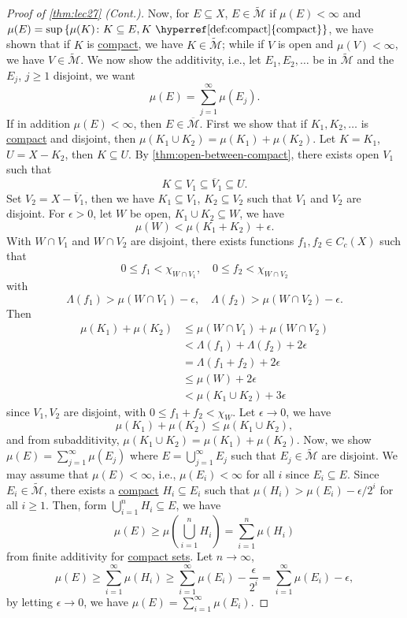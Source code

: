 \begin{proof}[Proof of \autoref{thm:lec27} (Cont.)]
	Now, for \(E \subseteq X\), \(E \in \widetilde{\mathcal{M}} \) if \(\mu (E) < \infty \) and \(\mu (E) = \sup \left\{ \mu (K) \colon K \subseteq E, K \text{ \hyperref[def:compact]{compact}}  \right\} \), we have shown that if \(K\) is \hyperref[def:compact]{compact}, we have \(K \in \widetilde{\mathcal{M}} \); while if \(V\) is open and \(\mu (V) < \infty \), we have \(V\in \widetilde{\mathcal{M}} \). We now show the additivity, i.e., let \(E_1, E_2, \dots \) be in \( \widetilde{\mathcal{M}} \) and the \(E_j\), \(j\geq 1\) disjoint, we want
	\[
		\mu (E) = \sum_{j=1}^{\infty} \mu (E_j).
	\]
	If in addition \(\mu (E) < \infty \), then \(E \in \overline{\mathcal{M}}\). First we show that if \(K_1, K_2, \dots  \) is \hyperref[def:compact]{compact} and disjoint, then \(\mu (K_1 \cup K_2) = \mu (K_1) + \mu (K_2)\). Let \(K = K_1\), \(U = X - K_2\), then \(K \subseteq U\). By \autoref{thm:open-between-compact}, there exists open \(V_1\) such that
	\[
		K \subseteq V_1 \subseteq \overline{V} _1 \subseteq U.
	\]
	Set \(V_2 = X - \overline{V} _1\), then we have \(K_1 \subseteq V_1\), \(K_2 \subseteq V_2\) such that \(V_1\) and \(V_2\) are disjoint. For \(\epsilon > 0\), let \(W\) be open, \(K_1 \cup K_2 \subseteq W\), we have
	\[
		\mu (W) < \mu (K_1 + K_2) + \epsilon.
	\]
	With \(W \cap V_1\) and \(W \cap V_2\) are disjoint, there exists functions \(f_1, f_2 \in C_c(X)\) such that
	\[
		0 \leq f_1 < \chi _{W \cap V_1}, \quad 0 \leq f_2 < \chi _{W \cap V_2}
	\]
	with
	\[
		\Lambda (f_1) > \mu (W \cap V_1) - \epsilon ,\quad \Lambda (f_2) > \mu (W \cap V_2) - \epsilon.
	\]
	Then
	\[
		\begin{split}
			\mu (K_1) + \mu (K_2)
			&\leq \mu (W \cap V_1) + \mu (W \cap V_2) \\
			&< \Lambda (f_1) + \Lambda (f_2) + 2\epsilon \\
			&= \Lambda (f_1 + f_2) + 2\epsilon \\
			&\leq \mu (W) + 2\epsilon \\
			&< \mu (K_1 \cup K_2) + 3\epsilon
		\end{split}
	\]
	since \(V_1, V_2\) are disjoint, with \(0 \leq f_1 + f_2 < \chi _W\). Let \(\epsilon \to 0\), we have
	\[
		\mu (K_1) + \mu (K_2) \leq \mu (K_1 \cup K_2),
	\]
	and from subadditivity, \(\mu (K_1 \cup K_2) = \mu (K_1) + \mu (K_2)\). Now, we show \(\mu (E) = \sum_{j=1}^{\infty} \mu (E_j)\) where \(E = \bigcup_{j=1}^{\infty} E_j\) such that \(E_j\in \widetilde{\mathcal{M}} \) are disjoint. We may assume that \(\mu (E) < \infty \), i.e., \(\mu (E_i) < \infty \) for all \(i\) since \(E_i \subseteq E\). Since \(E_i\in \widetilde{\mathcal{M}} \), there exists a \hyperref[def:compact]{compact} \(H_i \subseteq E_i\) such that \(\mu (H_i) > \mu (E_i) - \epsilon / 2^i\) for all \(i \geq 1\). Then, form \(\bigcup_{i=1}^{n} H_i \subseteq E\), we have
	\[
		\mu (E) \geq \mu \left( \bigcup_{i=1}^{n} H_i \right) = \sum_{i=1}^{n} \mu (H_i)
	\]
	from finite additivity for \hyperref[def:compact]{compact sets}. Let \(n \to \infty \),
	\[
		\mu (E)
		\geq \sum_{i=1}^{\infty} \mu (H_i)
		\geq \sum_{i=1}^{\infty} \mu (E_i) - \frac{\epsilon}{2^i}
		= \sum_{i=1}^{\infty} \mu (E_i) - \epsilon,
	\]
	by letting \(\epsilon \to 0\), we have \(\mu (E) = \sum_{i=1}^{\infty} \mu (E_i)\).


\end{proof}
